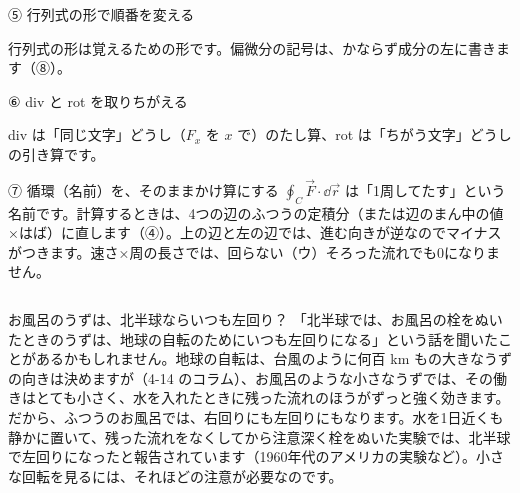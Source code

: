 \begingroup{}%
\noindent\begin{minipage}[t]{0.485\linewidth}\vspace{0pt}
\begin{tsumazuki}{⑤ 行列式の形で順番を変える}
\raggedright{}
行列式の形は覚えるための形です。偏微分の記号は、かならず成分の左に書きます（⑧）。
\end{tsumazuki}
\end{minipage}\hfill
\begin{minipage}[t]{0.485\linewidth}\vspace{0pt}
\begin{tsumazuki}{⑥ div と rot を取りちがえる}
\raggedright{}
div は「同じ文字」どうし（$F_x$ を $x$ で）のたし算、rot は「ちがう文字」どうしの引き算です。
\end{tsumazuki}
\end{minipage}\par
\endgroup

\begin{tsumazuki}{⑦ 循環（名前）を、そのままかけ算にする}
$\oint_C\vec F\cdot\dd\vec r$ は「1周してたす」という名前です。計算するときは、4つの辺のふつうの定積分（または辺のまん中の値×はば）に直します（④）。上の辺と左の辺では、進む向きが逆なのでマイナスがつきます。速さ×周の長さでは、回らない（ウ）そろった流れでも0になりません。
\end{tsumazuki}

\begin{column}{お風呂のうずは、北半球ならいつも左回り？}
「北半球では、お風呂の栓をぬいたときのうずは、地球の自転のためにいつも左回りになる」という話を聞いたことがあるかもしれません。地球の自転は、台風のように何百 km もの大きなうずの向きは決めますが（4-14 のコラム）、お風呂のような小さなうずでは、その働きはとても小さく、水を入れたときに残った流れのほうがずっと強く効きます。だから、ふつうのお風呂では、右回りにも左回りにもなります。水を1日近くも静かに置いて、残った流れをなくしてから注意深く栓をぬいた実験では、北半球で左回りになったと報告されています（1960年代のアメリカの実験など）。小さな回転を見るには、それほどの注意が必要なのです。
\end{column}

